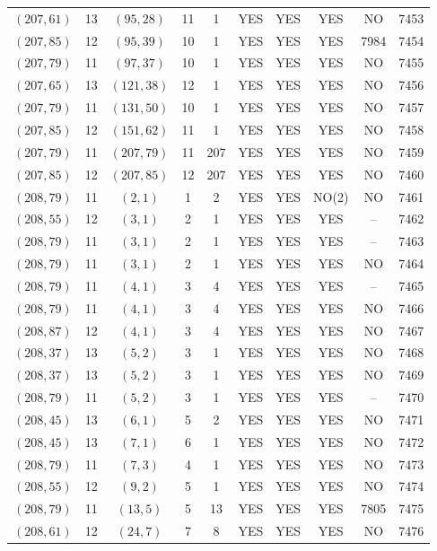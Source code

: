 \begin{longtable}{|c|c|c|c|c|c|c|c|c|c|}
$(207, 61)$ & 13 & $(95, 28)$ & 11 & 1 & YES & YES & YES & NO & 7453\\
$(207, 85)$ & 12 & $(95, 39)$ & 10 & 1 & YES & YES & YES & 7984 & 7454\\
$(207, 79)$ & 11 & $(97, 37)$ & 10 & 1 & YES & YES & YES & NO & 7455\\
$(207, 65)$ & 13 & $(121, 38)$ & 12 & 1 & YES & YES & YES & NO & 7456\\
$(207, 79)$ & 11 & $(131, 50)$ & 10 & 1 & YES & YES & YES & NO & 7457\\
$(207, 85)$ & 12 & $(151, 62)$ & 11 & 1 & YES & YES & YES & NO & 7458\\
$(207, 79)$ & 11 & $(207, 79)$ & 11 & 207 & YES & YES & YES & NO & 7459\\
$(207, 85)$ & 12 & $(207, 85)$ & 12 & 207 & YES & YES & YES & NO & 7460\\
$(208, 79)$ & 11 & $(2, 1)$ & 1 & 2 & YES & YES & NO(2) & NO & 7461\\
$(208, 55)$ & 12 & $(3, 1)$ & 2 & 1 & YES & YES & YES & -- & 7462\\
$(208, 79)$ & 11 & $(3, 1)$ & 2 & 1 & YES & YES & YES & -- & 7463\\
$(208, 79)$ & 11 & $(3, 1)$ & 2 & 1 & YES & YES & YES & NO & 7464\\
$(208, 79)$ & 11 & $(4, 1)$ & 3 & 4 & YES & YES & YES & -- & 7465\\
$(208, 79)$ & 11 & $(4, 1)$ & 3 & 4 & YES & YES & YES & NO & 7466\\
$(208, 87)$ & 12 & $(4, 1)$ & 3 & 4 & YES & YES & YES & NO & 7467\\
$(208, 37)$ & 13 & $(5, 2)$ & 3 & 1 & YES & YES & YES & NO & 7468\\
$(208, 37)$ & 13 & $(5, 2)$ & 3 & 1 & YES & YES & YES & NO & 7469\\
$(208, 79)$ & 11 & $(5, 2)$ & 3 & 1 & YES & YES & YES & -- & 7470\\
$(208, 45)$ & 13 & $(6, 1)$ & 5 & 2 & YES & YES & YES & NO & 7471\\
$(208, 45)$ & 13 & $(7, 1)$ & 6 & 1 & YES & YES & YES & NO & 7472\\
$(208, 79)$ & 11 & $(7, 3)$ & 4 & 1 & YES & YES & YES & NO & 7473\\
$(208, 55)$ & 12 & $(9, 2)$ & 5 & 1 & YES & YES & YES & NO & 7474\\
$(208, 79)$ & 11 & $(13, 5)$ & 5 & 13 & YES & YES & YES & 7805 & 7475\\
$(208, 61)$ & 12 & $(24, 7)$ & 7 & 8 & YES & YES & YES & NO & 7476\\

\end{longtable}
